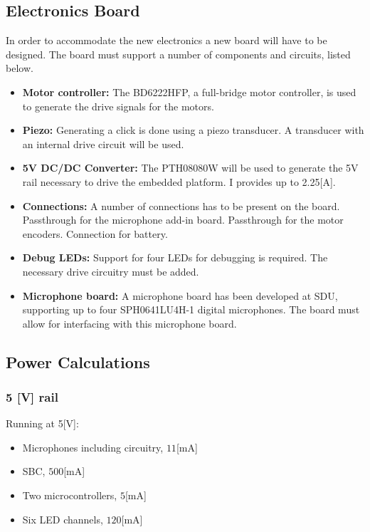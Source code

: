 \subsection{Electronics Board} %
\label{sub:electronics_board}
In order to accommodate the new electronics a new board will have to be designed.
The board must support a number of components and circuits, listed below.
\begin{itemize}
	\item \textbf{Motor controller:} The BD6222HFP, a full-bridge motor controller, is used to generate the drive signals for the motors.
	\item \textbf{Piezo:} Generating a click is done using a piezo transducer.
	A transducer with an internal drive circuit will be used.
	\item \textbf{5V DC/DC Converter:} The PTH08080W will be used to generate the 5V rail necessary to drive the embedded platform. I provides up to 2.25[A].
	\item \textbf{Connections:} A number of connections has to be present on the board.
	Passthrough for the microphone add-in board.
	Passthrough for the motor encoders.
	Connection for battery.
	\item \textbf{Debug LEDs:} Support for four LEDs for debugging is required.
	The necessary drive circuitry must be added.
	\item \textbf{Microphone board:} A microphone board has been developed at SDU, supporting up to four SPH0641LU4H-1 digital microphones. The board must allow for interfacing with this microphone board.
\end{itemize}


\subsection{Power Calculations} %
\label{sub:power_calculations}

\subsubsection{5 [V] rail} %

Running at 5[V]:
\begin{itemize}
	\item Microphones including circuitry, $11$[mA]
	\item SBC, $500$[mA]
	\item Two microcontrollers, $5$[mA]
	\item Six LED channels, $120$[mA]
\end{itemize}

